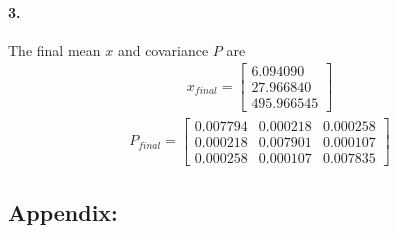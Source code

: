 \documentclass[a4paper]{article}
\begin{document}
\paragraph{3. } The final mean $x$ and covariance $P$ are
\begin{align*}
x_{final} = 
	\begin{bmatrix}
		6.094090   \\   27.966840  \\   495.966545
	\end{bmatrix}
\end{align*}
\begin{align*}
P_{final} = 
	\begin{bmatrix}
        0.007794   &    0.000218   &    0.000258\\
        0.000218   &    0.007901   &    0.000107\\
        0.000258   &    0.000107   &    0.007835
	\end{bmatrix}
\end{align*}

\newpage
\subsection*{Appendix:}



\end{document}
